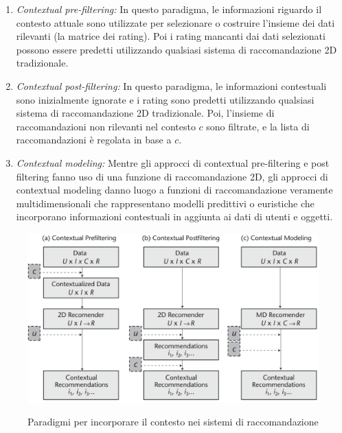 \documentclass[12pt,italian]{report}
\begin{document}
\begin{enumerate}
 \item \textit{Contextual pre-filtering:} In questo paradigma, le informazioni riguardo il contesto attuale sono utilizzate per selezionare o costruire l'insieme dei dati rilevanti (la matrice dei rating). Poi i rating mancanti dai dati selezionati possono essere predetti utilizzando qualsiasi sistema di raccomandazione 2D tradizionale.
 \item \textit{Contextual post-filtering:} In questo paradigma, le informazioni contestuali sono inizialmente ignorate e i rating sono predetti utilizzando qualsiasi sistema di raccomandazione 2D tradizionale. Poi, l'insieme di raccomandazioni non rilevanti nel contesto $c$ sono filtrate, e la lista di raccomandazioni è regolata in base a $c$.
 \item  \textit{Contextual modeling:} Mentre gli approcci di contextual pre-filtering e post filtering fanno uso di una funzione di raccomandazione 2D, gli approcci di contextual modeling danno luogo a funzioni di raccomandazione veramente multidimensionali che rappresentano modelli predittivi o euristiche che incorporano informazioni contestuali in aggiunta ai dati di utenti e oggetti.
\end{enumerate}

\begin{figure}
  \centering
  \includegraphics[width=\linewidth]{immagini/paradigm_for_context_inclusion.png}
  \caption{Paradigmi per incorporare il contesto nei sistemi di raccomandazione}
  \cite{context-paradigm}
  \label{fig:context-paradigm}
\end{figure}

\end{document}
